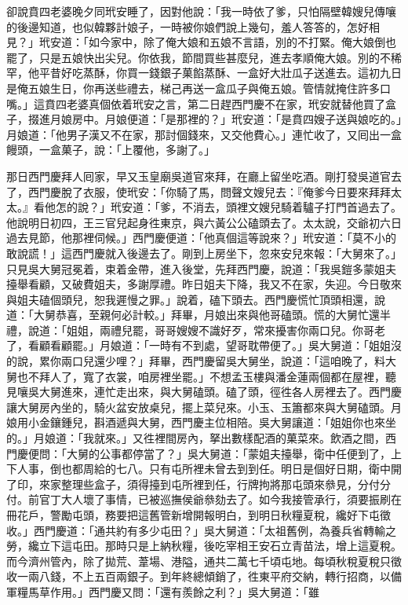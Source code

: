 卻說賁四老婆晚夕同玳安睡了，因對他說：「我一時依了爹，只怕隔壁韓嫂兒傳嚷的後邊知道，也似韓夥計娘子，一時被你娘們說上幾句，羞人答答的，怎好相見？」玳安道：「如今家中，除了俺大娘和五娘不言語，別的不打緊。俺大娘倒也罷了，只是五娘快出尖兒。你依我，節間買些甚麼兒，進去孝順俺大娘。別的不稀罕，他平昔好吃蒸酥，你買一錢銀子菓餡蒸酥、一盒好大壯瓜子送進去。這初九日是俺五娘生日，你再送些禮去，梯己再送一盒瓜子與俺五娘。管情就掩住許多口嘴。」{}這賁四老婆真個依着玳安之言，第二日趕西門慶不在家，玳安就替他買了盒子，掇進月娘房中。月娘便道：「是那裡的？」玳安道：「是賁四嫂子送與娘吃的。」月娘道：「他男子漢又不在家，那討個錢來，又交他費心。」連忙收了，又囘出一盒饅頭，一盒菓子，說：「上覆他，多謝了。」

那日西門慶拜人囘家，早又玉皇廟吳道官來拜，在廳上留坐吃酒。剛打發吳道官去了，西門慶脫了衣服，使玳安：「你騎了馬，問聲文嫂兒去：『俺爹今日要來拜拜太太。』看他怎的說？」玳安道：「爹，不消去，頭裡文嫂兒騎着驢子打門首過去了。他說明日初四，王三官兒起身徃東京，與六黃公公磕頭去了。太太說，交爺初六日過去見節，他那裡伺候。」西門慶便道：「他真個這等說來？」玳安道：「莫不小的敢說謊！」這西門慶就入後邊去了。剛到上房坐下，忽來安兒來報：「大舅來了。」只見吳大舅冠冕着，束着金帶，進入後堂，先拜西門慶，說道：「我吳鎧多蒙姐夫擡舉看顧，又破費姐夫，多謝厚禮。昨日姐夫下降，我又不在家，失迎。今日敬來與姐夫磕個頭兒，恕我遲慢之罪。」說着，磕下頭去。西門慶慌忙頂頭相還，說道：「大舅恭喜，至親何必計較。」拜畢，月娘出來與他哥磕頭。慌的大舅忙還半禮，說道：「姐姐，兩禮兒罷，哥哥嫂嫂不識好歹，常來擾害你兩口兒。你哥老了，看顧看顧罷。」月娘道：「一時有不到處，望哥耽帶便了。」吳大舅道：「姐姐沒的說，累你兩口兒還少哩？」拜畢，西門慶留吳大舅坐，說道：「這咱晚了，料大舅也不拜人了，寬了衣裳，咱房裡坐罷。」不想孟玉樓與潘金蓮兩個都在屋裡，聽見嚷吳大舅進來，連忙走出來，與大舅磕頭。磕了頭，徑徃各人房裡去了。西門慶讓大舅房內坐的，騎火盆安放桌兒，擺上菜兒來。小玉、玉簫都來與大舅磕頭。月娘用小金鑲鍾兒，斟酒遞與大舅，西門慶主位相陪。吳大舅讓道：「姐姐你也來坐的。」月娘道：「我就來。」又徃裡間房內，拏出數樣配酒的菓菜來。飲酒之間，西門慶便問：「大舅的公事都停當了？」吳大舅道：「蒙姐夫擡舉，衛中任便到了，上下人事，倒也都周給的七八。只有屯所裡未曾去到到任。明日是個好日期，衛中開了印，來家整理些盒子，須得擡到屯所裡到任，行牌拘將那屯頭來叅見，分付分付。前官丁大人壞了事情，已被巡撫侯爺叅劾去了。如今我接管承行，須要振刷在冊花戶，警勵屯頭，務要把這舊管新增開報明白，到明日秋糧夏稅，纔好下屯徵收。」西門慶道：「通共約有多少屯田？」吳大舅道：「太祖舊例，為養兵省轉輸之勞，纔立下這屯田。那時只是上納秋糧，後吃宰相王安石立青苗法，增上這夏稅。而今濟州管內，除了拋荒、葦場、港隘，通共二萬七千頃屯地。每頃秋稅夏稅只徵收一兩八錢，不上五百兩銀子。到年終總傾銷了，徃東平府交納，轉行招商，以備軍糧馬草作用。」西門慶又問：「還有羨餘之利？」吳大舅道：「雖